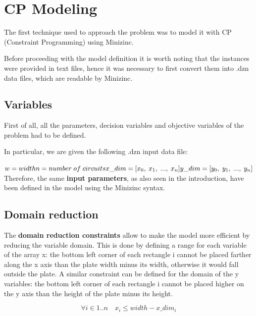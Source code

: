 \section{CP Modeling}

The first technique used to approach the problem was to model it with CP (Constraint Programming) using Minizinc.

Before proceeding with the model definition it is worth noting that the instances were provided in text files, hence it was necessary to first convert them into .dzn data files, which are readable by Minizinc.

\subsection{Variables}

First of all, all the parameters, decision variables and objective variables of the problem had to be defined. 

In particular, we are given the following .dzn input data file:

$w = {width} \\
n = {number \; of \; circuits} \\
x\_dim = [{x_0}, \; {x_1}, \; ..., \; {x_n}] \\
y\_dim = [{y_0}, \; {y_1}, \; ..., \; {y_n}]$ \\

Therefore, the same \textbf{input parameters}, as also seen in the introduction, have been defined in the model using the Minizinc syntax.

\subsection{Domain reduction}

The \textbf{domain reduction constraints} allow to make the model more efficient by reducing the variable domain. This is done by defining a range for each variable of the array x: the bottom left corner of each rectangle i cannot be placed farther along the x axis than the plate width minus its width, otherwise it would fall outside the plate. A similar constraint can be defined for the domain of the y variables: the bottom left corner of each rectangle i cannot be placed higher on the y axis than the height of the plate minus its height.

\begin{equation*}
    \forall i \in {1..n} \quad x_i \leq width - x\_dim_i
\end{equation*}

